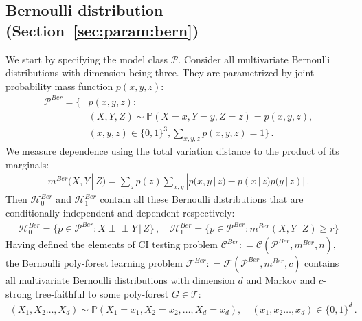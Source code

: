 \documentclass{article}
\theoremstyle{definition}
\theoremstyle{definition}
\theoremstyle{definition}
\theoremstyle{definition}
\theoremstyle{definition}
\theoremstyle{definition}
\theoremstyle{remark}
\theoremstyle{remark}
\newcommand{\prob}{\mathbb{P}}
\newcommand{\given}{\,|\,}
\newcommand{\indep}{\perp \!\!\! \perp }
\newcommand{\pltr}{\mathcal{T}}
\newcommand{\dpdm}{m}
\newcommand{\dd}{d}
\newcommand{\ciclass}{\mathcal{C}}
\newcommand{\pfclass}{\mathcal{F}}
\newcommand{\hone}{\mathcal{H}_1}
\newcommand{\hzero}{\mathcal{H}_0}
\begin{document}
\subsection{Bernoulli distribution (Section~\ref{sec:param:bern})}\label{app:details:bern}
We start by specifying the model class $\mathcal{P}$.
Consider all multivariate Bernoulli distributions with dimension being three. They are parametrized by joint probability mass function $p(x,y,z)$:
\begin{align*}
    \mathcal{P}^{Ber} = \bigg\{ & p(x,y,z): \\
    & (X,Y,Z)\sim \prob(X=x, Y=y, Z=z)= p(x,y,z),  \\
    & (x,y,z)\in\{0,1\}^3, \sum_{x,y,z}p(x,y,z)=1 \bigg\} \,.
\end{align*}
We measure dependence using the total variation distance to the product of its marginals:
\begin{align*}
    \dpdm^{Ber}(X,Y\given Z) = \sum_z p(z)\sum_{x,y}|p(x,y\given z) -p(x\given z)p(y\given z)| \,.
\end{align*}
Then $\hzero^{Ber}$ and $\hone^{Ber}$ contain all these Bernoulli distributions that are conditionally independent and dependent respectively:
\begin{align*}
    \hzero^{Ber} = \{p\in \mathcal{P}^{Ber}: X\indep Y\given Z\}\,, \quad \hone^{Ber} = \{p\in \mathcal{P}^{Ber}: \dpdm^{Ber}(X,Y\given Z) \ge r\}
\end{align*}
Having defined the elements of CI testing problem $\ciclass^{Ber}: = \ciclass(\mathcal{P}^{Ber},\dpdm^{Ber},n)$, the Bernoulli poly-forest learning problem $\pfclass^{Ber}: = \pfclass(\mathcal{P}^{Ber},\dpdm^{Ber},c)$ contains all multivariate Bernoulli distributions with dimension $\dd$ and Markov and $c$-strong tree-faithful to some poly-forest $G\in \pltr$:
\begin{align*}
    (X_1,X_2\ldots,X_\dd) \sim \prob(X_1=x_1, X_2=x_2,\ldots, X_\dd=x_\dd), \quad (x_1,x_2\ldots,x_\dd)\in\{0,1\}^\dd\,.
\end{align*}
\end{document}
